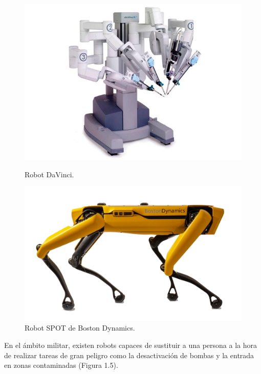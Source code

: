 \documentclass[a4paper, 12pt]{book}
\begin{document}
\begin{figure}[H]
  \centering
  \begin{minipage}[b]{0.4\textwidth}
    \includegraphics[width=\textwidth]{img/davinci}
    \caption{Robot DaVinci.}
    \label{figura:robot_davinci}
  \end{minipage}
  \hfill
  \begin{minipage}[b]{0.4\textwidth}
    \includegraphics[width=\textwidth]{img/spot_bd.png}
    \caption{Robot SPOT de Boston Dynamics.}
    \label{figura:robot_spot}
  \end{minipage}
\end{figure}

En el ámbito militar, existen robots capaces de sustituir a una persona a la hora de realizar tareas de gran peligro como la desactivación de bombas y la entrada en zonas contaminadas (Figura 1.5).
\end{document}
